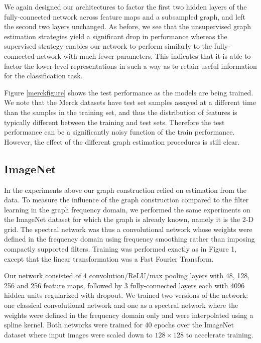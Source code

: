 We again designed our architectures to factor the first two hidden layers of the fully-connected network across feature maps and a subsampled graph, and left the second two layers unchanged. As before, we see that the unsupervised graph estimation strategies yield a significant drop in performance whereas the supervised strategy enables our network to perform similarly to the fully-connected network with much fewer parameters. This indicates that it is able to factor the lower-level representations in such a way as to retain useful information for the classification task.

Figure \ref{merckfigure} shows the test performance as the models are being trained. We note that the Merck datasets have test set samples assayed at a different time than the samples in the training set, and thus the distribution of features is typically different between the training and test sets. Therefore the test performance can be a significantly noisy function of the train performance. However, the effect of the different graph estimation procedures is still clear. 

\subsection{ImageNet}



In the experiments above our graph construction relied on estimation from the data. 
To measure the influence of the graph construction compared to the filter learning in the graph frequency domain, we performed the same experiments on the ImageNet dataset for which the graph is already known, namely it is the 2-D grid. The spectral network was thus a convolutional network whose weights were defined in the frequency domain using frequency smoothing rather than imposing compactly supported filters.
 Training was performed exactly as in Figure 1, except that the linear transformation was a Fast Fourier Transform. 

Our network consisted of 4 convolution/ReLU/max pooling layers with 48, 128, 256 and 256 feature maps, followed by 3 fully-connected layers each with 4096 hidden units regularized with dropout. We trained two versions of the network: one classical convolutional network and one as a spectral network where the weights were defined in the frequency domain only and were interpolated using a spline kernel. Both networks were trained for 40 epochs over the ImageNet dataset where input images were scaled down to $128 \times 128$ to accelerate training.  

